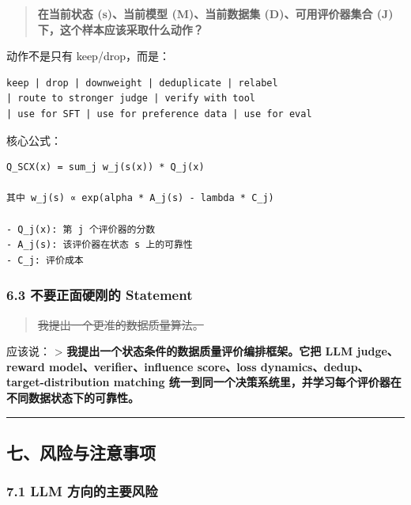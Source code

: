 \documentclass[
  12pt,
]{ctexart}
\begin{document}
\begin{quote}
\textbf{在当前状态 (s)、当前模型 (M)、当前数据集 (D)、可用评价器集合 (J)
下，这个样本应该采取什么动作？}
\end{quote}

动作不是只有 keep/drop，而是：

\begin{verbatim}
keep | drop | downweight | deduplicate | relabel
| route to stronger judge | verify with tool
| use for SFT | use for preference data | use for eval
\end{verbatim}

核心公式：

\begin{verbatim}
Q_SCX(x) = sum_j w_j(s(x)) * Q_j(x)

其中 w_j(s) ∝ exp(alpha * A_j(s) - lambda * C_j)

- Q_j(x): 第 j 个评价器的分数
- A_j(s): 该评价器在状态 s 上的可靠性
- C_j: 评价成本
\end{verbatim}

\subsubsection{6.3 不要正面硬刚的
Statement}\label{ux4e0dux8981ux6b63ux9762ux786cux521aux7684-statement}

\begin{quote}
\st{我提出一个更准的数据质量算法。}
\end{quote}

应该说： \textgreater{}
\textbf{我提出一个状态条件的数据质量评价编排框架。它把 LLM judge、reward
model、verifier、influence score、loss
dynamics、dedup、target-distribution matching
统一到同一个决策系统里，并学习每个评价器在不同数据状态下的可靠性。}

\begin{center}\rule{0.5\linewidth}{0.5pt}\end{center}

\subsection{七、风险与注意事项}\label{ux4e03ux98ceux9669ux4e0eux6ce8ux610fux4e8bux9879}

\subsubsection{7.1 LLM
方向的主要风险}\label{llm-ux65b9ux5411ux7684ux4e3bux8981ux98ceux9669}
\end{document}
